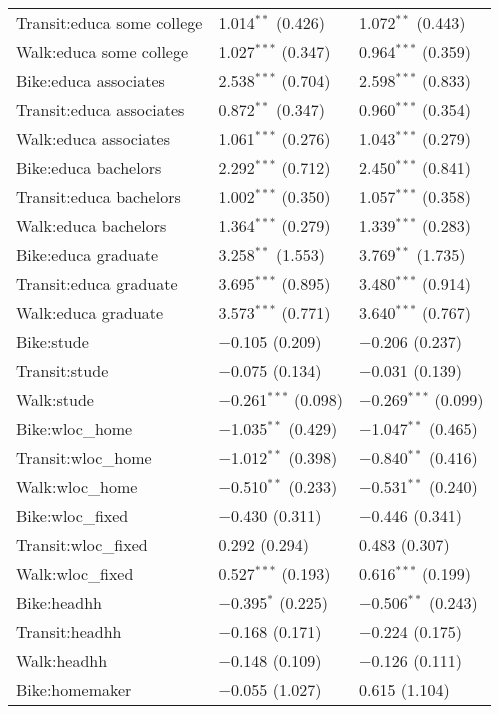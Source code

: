 \begin{longtabu}{lll}
	Transit:educa some college & 1.014$^{**}$ (0.426) & 1.072$^{**}$ (0.443) \\ 
	Walk:educa some college & 1.027$^{***}$ (0.347) & 0.964$^{***}$ (0.359) \\ 
	Bike:educa associates & 2.538$^{***}$ (0.704) & 2.598$^{***}$ (0.833) \\ 
	Transit:educa associates & 0.872$^{**}$ (0.347) & 0.960$^{***}$ (0.354) \\ 
	Walk:educa associates & 1.061$^{***}$ (0.276) & 1.043$^{***}$ (0.279) \\ 
	Bike:educa bachelors & 2.292$^{***}$ (0.712) & 2.450$^{***}$ (0.841) \\ 
	Transit:educa bachelors & 1.002$^{***}$ (0.350) & 1.057$^{***}$ (0.358) \\ 
	Walk:educa bachelors & 1.364$^{***}$ (0.279) & 1.339$^{***}$ (0.283) \\ 
	Bike:educa graduate & 3.258$^{**}$ (1.553) & 3.769$^{**}$ (1.735) \\ 
	Transit:educa graduate & 3.695$^{***}$ (0.895) & 3.480$^{***}$ (0.914) \\ 
	Walk:educa graduate & 3.573$^{***}$ (0.771) & 3.640$^{***}$ (0.767) \\ 
	Bike:stude & $-$0.105 (0.209) & $-$0.206 (0.237) \\ 
	Transit:stude & $-$0.075 (0.134) & $-$0.031 (0.139) \\ 
	Walk:stude & $-$0.261$^{***}$ (0.098) & $-$0.269$^{***}$ (0.099) \\ 
	Bike:wloc\_home & $-$1.035$^{**}$ (0.429) & $-$1.047$^{**}$ (0.465) \\ 
	Transit:wloc\_home & $-$1.012$^{**}$ (0.398) & $-$0.840$^{**}$ (0.416) \\ 
	Walk:wloc\_home & $-$0.510$^{**}$ (0.233) & $-$0.531$^{**}$ (0.240) \\ 
	Bike:wloc\_fixed & $-$0.430 (0.311) & $-$0.446 (0.341) \\ 
	Transit:wloc\_fixed & 0.292 (0.294) & 0.483 (0.307) \\ 
	Walk:wloc\_fixed & 0.527$^{***}$ (0.193) & 0.616$^{***}$ (0.199) \\ 
	Bike:headhh & $-$0.395$^{*}$ (0.225) & $-$0.506$^{**}$ (0.243) \\ 
	Transit:headhh & $-$0.168 (0.171) & $-$0.224 (0.175) \\ 
	Walk:headhh & $-$0.148 (0.109) & $-$0.126 (0.111) \\ 
	Bike:homemaker & $-$0.055 (1.027) & 0.615 (1.104) \\ 

\end{longtabu}
